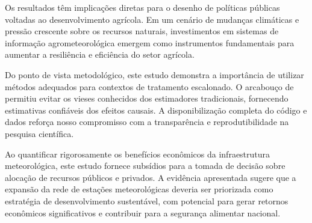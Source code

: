 \documentclass[
	12pt,				%
	oneside,			%
	a4paper,			%
	english,			%
	french,				%
	spanish,			%
	brazil				%
	]{abntex2}
\begin{document}
Os resultados têm implicações diretas para o desenho de políticas públicas voltadas ao desenvolvimento agrícola. Em um cenário de mudanças climáticas e pressão crescente sobre os recursos naturais, investimentos em sistemas de informação agrometeorológica emergem como instrumentos fundamentais para aumentar a resiliência e eficiência do setor agrícola.

Do ponto de vista metodológico, este estudo demonstra a importância de utilizar métodos adequados para contextos de tratamento escalonado. O arcabouço de  permitiu evitar os vieses conhecidos dos estimadores tradicionais, fornecendo estimativas confiáveis dos efeitos causais. A disponibilização completa do código e dados reforça nosso compromisso com a transparência e reprodutibilidade na pesquisa científica.

Ao quantificar rigorosamente os benefícios econômicos da infraestrutura meteorológica, este estudo fornece subsídios para a tomada de decisão sobre alocação de recursos públicos e privados. A evidência apresentada sugere que a expansão da rede de estações meteorológicas deveria ser priorizada como estratégia de desenvolvimento sustentável, com potencial para gerar retornos econômicos significativos e contribuir para a segurança alimentar nacional.

\postextual



%
%

\end{document}
